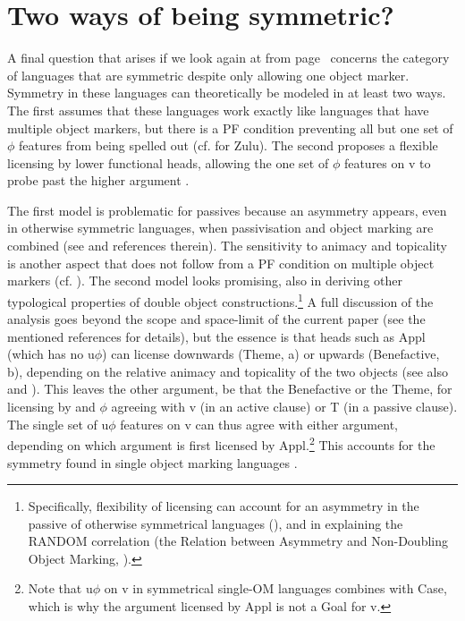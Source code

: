 \documentclass[output=paper
,modfonts
,nonflat]{langsci/langscibook}
\begin{document}
\section{Two ways of being symmetric?} \label{sec-vdwal:7}

A final question that arises if we look again at  from page~\pageref{Table 3} concerns the category of languages that are symmetric despite only allowing one object marker. Symmetry in these languages can theoretically be modeled in at least two ways. The first assumes that these languages work exactly like languages that have multiple object markers, but there is a PF condition preventing all but one set of $\phi$ features from being spelled out (cf. \citealt{Adams2010} for Zulu). The second proposes a flexible licensing by lower functional heads, allowing the one set of $\phi$ features on v to probe past the higher argument \citep{Haddican_Holmberg2012, Haddican_Holmberg2015,Van_der_Wal2017a, Holmberg_Et_AlTA}.\largerpage

The first model is problematic for passives because an asymmetry appears, even in otherwise symmetric languages, when passivisation and object marking are combined (see \citealt{Holmberg_Et_AlTA} and references therein). The sensitivity to animacy and topicality is another aspect that does not follow from a PF condition on multiple object markers (cf. \citealt{Zeller2012}). The second model looks promising, also in deriving other typological properties of double object constructions.{\footnote{Specifically, flexibility of licensing can account for an asymmetry in the passive of otherwise symmetrical languages (\citealt{Holmberg_Et_AlTA}), and in explaining the RANDOM correlation (the Relation between Asymmetry and Non-Doubling Object Marking, \citealt{Van_der_Wal2017b}).} A full discussion of the analysis goes beyond the scope and space-limit of the current paper (see the mentioned references for details), but the essence is that heads such as Appl (which has no u$\phi$) can license downwards (Theme, a) or upwards (Benefactive, b), depending on the relative animacy and topicality of the two objects (see also  and ). This leaves the other argument, be that the Benefactive or the Theme, for licensing by and $\phi$ agreeing with v (in an active clause) or T (in a passive clause). The single set of u$\phi$ features on v can thus agree with either argument, depending on which argument is first licensed by Appl.\footnote{Note that u$\phi$ on v in symmetrical single-OM languages combines with Case, which is why the argument licensed by Appl is not a Goal for v.} This accounts for the symmetry found in single object marking languages \citep{Van_der_Wal2017a}.}
\end{document}
